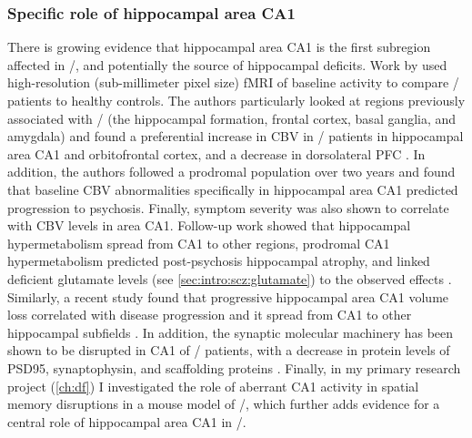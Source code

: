 \subsubsection{Specific role of hippocampal area CA1}
There is growing evidence that hippocampal area CA1 is the first subregion affected in \scz/, and potentially the source of hippocampal deficits.
Work by \citeauthor{Schobel2009} used high-resolution (sub-millimeter pixel size) \ac{fMRI} of baseline activity to compare \scz/ patients to healthy controls.
The authors particularly looked at regions previously associated with \scz/ (the hippocampal formation, frontal cortex, basal ganglia, and amygdala) and found a preferential increase in \ac{CBV} in \scz/ patients in hippocampal area CA1 and orbitofrontal cortex, and a decrease in dorsolateral PFC \citep{Schobel2009}.
In addition, the authors followed a prodromal population over two years and found that baseline \ac{CBV} abnormalities specifically in hippocampal area CA1 predicted progression to psychosis.
Finally, symptom severity was also shown to correlate with \ac{CBV} levels in area CA1. Follow-up work showed that hippocampal hypermetabolism spread from CA1 to other regions, prodromal CA1 hypermetabolism predicted post-psychosis hippocampal atrophy, and linked deficient glutamate levels (see \autoref{sec:intro:scz:glutamate}) to the observed effects \citep{Schobel2013}.
Similarly, a recent study found that progressive hippocampal area CA1 volume loss correlated with disease progression and it spread from CA1 to other hippocampal subfields \citep{Ho2017}.
In addition, the synaptic molecular machinery has been shown to be disrupted in CA1 of \scz/ patients, with a decrease in protein levels of PSD95, synaptophysin, and scaffolding proteins \citep{Matosin2016}. 
Finally, in my primary research project (\autoref{ch:df}) I investigated the role of aberrant CA1 activity in spatial memory disruptions in a mouse model of \scz/, which further adds evidence for a central role of hippocampal area CA1 in \scz/.

